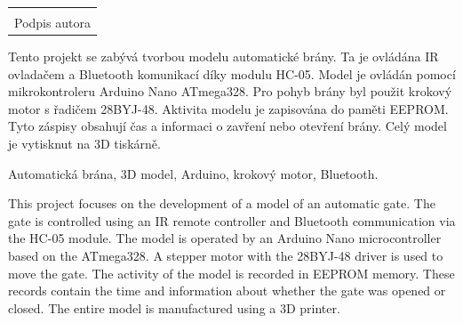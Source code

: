 \documentclass[12pt, a4paper,
twoside,        %
openright
]{report}
\newcommand\datumOdevzdani{1. 1. 2026} %
\begin{document}
	\vfill
	\noindent{V Opavě \datumOdevzdani\\}
	\noindent
	\begin{minipage}{\linewidth}
		\hspace{9.5cm} 
		\begin{tabular}{@{}p{6cm}@{}}
			\dotfill \\
			Podpis autora
		\end{tabular}
	\end{minipage}
	
	\cleardoublepage %
	
	
	Tento projekt se zabývá tvorbou modelu automatické brány. Ta je ovládána IR ovladačem a Bluetooth komunikací díky modulu HC-05. Model je ovládán pomocí mikrokontroleru Arduino Nano ATmega328. Pro pohyb brány byl použit krokový motor s řadičem 28BYJ-48. Aktivita modelu je zapisována do paměti EEPROM. Tyto záspisy obsahují čas a informaci o zavření nebo otevření brány. Celý model je vytisknut na 3D tiskárně.
	
	\vspace{18pt}
	
	
	\noindent Automatická brána, 3D model, Arduino, krokový motor, Bluetooth. 
	
	\vspace{18pt}
	
	
	\noindent This project focuses on the development of a model of an automatic gate. The gate is controlled using an IR remote controller and Bluetooth communication via the HC-05 module. The model is operated by an Arduino Nano microcontroller based on the ATmega328. A stepper motor with the 28BYJ-48 driver is used to move the gate. The activity of the model is recorded in EEPROM memory. These records contain the time and information about whether the gate was opened or closed. The entire model is manufactured using a 3D printer. %
	
\end{document}
